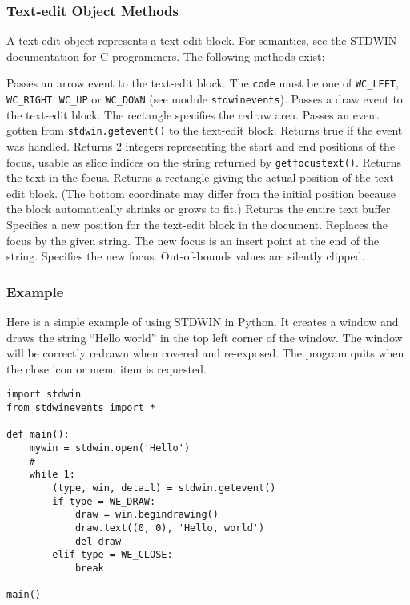 \subsubsection{Text-edit Object Methods}

A text-edit object represents a text-edit block.
For semantics, see the STDWIN documentation for C programmers.
The following methods exist:
\begin{description}
Passes an arrow event to the text-edit block.
The
{\tt code}
must be one of
{\tt WC\_LEFT},
{\tt WC\_RIGHT},
{\tt WC\_UP}
or
{\tt WC\_DOWN}
(see module
{\tt stdwinevents}).
Passes a draw event to the text-edit block.
The rectangle specifies the redraw area.
Passes an event gotten from
{\tt stdwin.getevent()}
to the text-edit block.
Returns true if the event was handled.
Returns 2 integers representing the start and end positions of the
focus, usable as slice indices on the string returned by
{\tt getfocustext()}.
Returns the text in the focus.
Returns a rectangle giving the actual position of the text-edit block.
(The bottom coordinate may differ from the initial position because
the block automatically shrinks or grows to fit.)
Returns the entire text buffer.
Specifies a new position for the text-edit block in the document.
Replaces the focus by the given string.
The new focus is an insert point at the end of the string.
Specifies the new focus.
Out-of-bounds values are silently clipped.
\end{description}

\subsubsection{Example}

Here is a simple example of using STDWIN in Python.
It creates a window and draws the string ``Hello world'' in the top
left corner of the window.
The window will be correctly redrawn when covered and re-exposed.
The program quits when the close icon or menu item is requested.
\bcode\begin{verbatim}
import stdwin
from stdwinevents import *

def main():
    mywin = stdwin.open('Hello')
    #
    while 1:
        (type, win, detail) = stdwin.getevent()
        if type = WE_DRAW:
            draw = win.begindrawing()
            draw.text((0, 0), 'Hello, world')
            del draw
        elif type = WE_CLOSE:
            break

main()
\end{verbatim}\ecode

